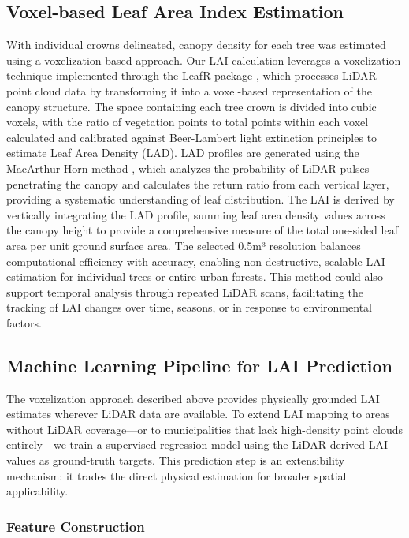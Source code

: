 \subsection{Voxel-based Leaf Area Index Estimation}\label{LAI}
With individual crowns delineated, canopy density for each tree was estimated using a voxelization-based approach. Our LAI calculation leverages a voxelization technique implemented through the LeafR package \cite{almeidaLeafRPackageEstimating2019}, which processes LiDAR point cloud data by transforming it into a voxel-based representation of the canopy structure. The space containing each tree crown is divided into cubic voxels, with the ratio of vegetation points to total points within each voxel calculated and calibrated against Beer-Lambert light extinction principles to estimate Leaf Area Density (LAD). LAD profiles are generated using the MacArthur-Horn method \cite{macarthurFoliageProfileHeight1969}
, which analyzes the probability of LiDAR pulses penetrating the canopy and calculates the return ratio from each vertical layer, providing a systematic understanding of leaf distribution. The LAI is derived by vertically integrating the LAD profile, summing leaf area density values across the canopy height to provide a comprehensive measure of the total one-sided leaf area per unit ground surface area. The selected 0.5m³ resolution balances computational efficiency with accuracy, enabling non-destructive, scalable LAI estimation for individual trees or entire urban forests. This method could also support temporal analysis through repeated LiDAR scans, facilitating the tracking of LAI changes over time, seasons, or in response to environmental factors.

\subsection{Machine Learning Pipeline for LAI Prediction}

The voxelization approach described above provides physically grounded LAI estimates wherever LiDAR data are available. To extend LAI mapping to areas without LiDAR coverage---or to municipalities that lack high-density point clouds entirely---we train a supervised regression model using the LiDAR-derived LAI values as ground-truth targets. This prediction step is an extensibility mechanism: it trades the direct physical estimation for broader spatial applicability.

\subsubsection{Feature Construction}

